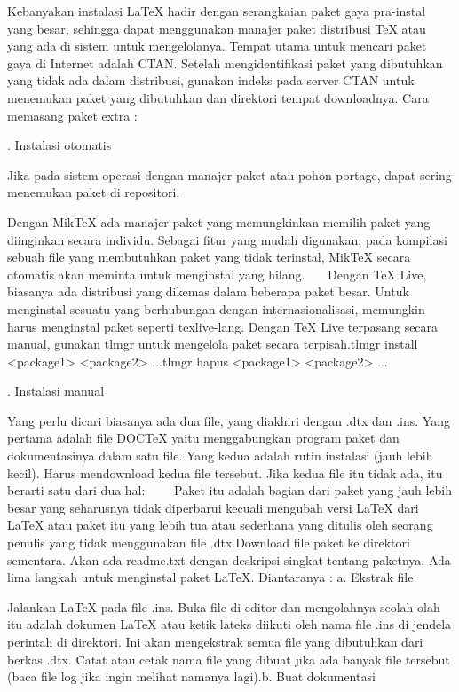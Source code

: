 Kebanyakan instalasi LaTeX hadir dengan serangkaian paket gaya pra-instal yang besar, sehingga dapat menggunakan manajer paket distribusi TeX atau yang ada di sistem untuk mengelolanya. Tempat utama untuk mencari paket gaya di Internet adalah CTAN. Setelah mengidentifikasi paket yang dibutuhkan yang tidak ada dalam distribusi, gunakan indeks pada server CTAN untuk menemukan paket yang dibutuhkan dan direktori tempat downloadnya. Cara memasang paket extra :\par

. Instalasi otomatis\par

Jika pada sistem operasi dengan manajer paket atau pohon portage, dapat sering menemukan paket di repositori. \par

Dengan MikTeX ada manajer paket yang memungkinkan memilih paket yang diinginkan secara individu. Sebagai fitur yang mudah digunakan, pada kompilasi sebuah file yang membutuhkan paket yang tidak terinstal, MikTeX secara otomatis akan meminta untuk menginstal yang hilang.~~~ Dengan TeX Live, biasanya ada distribusi yang dikemas dalam beberapa paket besar. Untuk menginstal sesuatu yang berhubungan dengan internasionalisasi, memungkin harus menginstal paket seperti texlive-lang. Dengan TeX Live terpasang secara manual, gunakan tlmgr untuk mengelola paket secara terpisah.tlmgr install <package1> <package2> ...tlmgr hapus <package1> <package2> ...\par

. Instalasi manual\par
Yang perlu dicari biasanya ada dua file, yang diakhiri dengan .dtx dan .ins. Yang pertama adalah file DOCTeX yaitu menggabungkan program paket dan dokumentasinya dalam satu file. Yang kedua adalah rutin instalasi (jauh lebih kecil). Harus mendownload kedua file tersebut. Jika kedua file itu tidak ada, itu berarti satu dari dua hal:     Paket itu adalah bagian dari paket yang jauh lebih besar yang seharusnya tidak diperbarui kecuali mengubah versi LaTeX dari LaTeX atau paket itu yang lebih tua atau sederhana yang ditulis oleh seorang penulis yang tidak menggunakan file .dtx.Download file paket ke direktori sementara. Akan ada readme.txt dengan deskripsi singkat tentang paketnya.  Ada lima langkah untuk menginstal paket LaTeX. Diantaranya : a. Ekstrak file\par

Jalankan LaTeX pada file .ins. Buka file di editor dan mengolahnya seolah-olah itu adalah dokumen LaTeX atau ketik lateks diikuti oleh nama file .ins di jendela perintah di direktori. Ini akan mengekstrak semua file yang dibutuhkan dari berkas .dtx. Catat atau cetak nama file yang dibuat jika ada banyak file tersebut (baca file log jika ingin melihat namanya lagi).b. Buat dokumentasi \par


